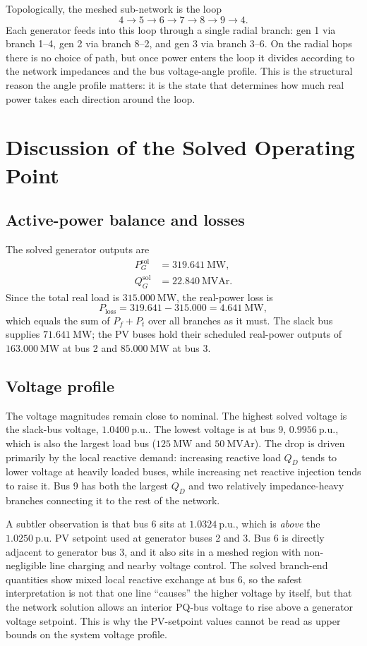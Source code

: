 \documentclass[11pt]{article}
\newcommand{\pu}{\mathrm{p.u.}}
\newcommand{\MW}{\mathrm{MW}}
\newcommand{\MVAr}{\mathrm{MVAr}}
\begin{document}
Topologically, the meshed sub-network is the loop
\[
  4 \rightarrow 5 \rightarrow 6 \rightarrow 7 \rightarrow 8
  \rightarrow 9 \rightarrow 4.
\]
Each generator feeds into this loop through a single radial branch:
gen 1 via branch 1--4, gen 2 via branch 8--2, and gen 3 via branch 3--6.
On the radial hops there is no choice of path, but once power enters the
loop it divides according to the network impedances and the bus
voltage-angle profile. This is the structural reason the angle profile
matters: it is the state that determines how much real power takes each
direction around the loop.

\section{Discussion of the Solved Operating Point}

\subsection{Active-power balance and losses}

The solved generator outputs are
\[
\begin{aligned}
  P_G^{\mathrm{sol}} &= 319.641~\MW, \\
  Q_G^{\mathrm{sol}} &= 22.840~\MVAr.
\end{aligned}
\]
Since the total real load is $315.000~\MW$, the real-power loss is
\[
  P_{\mathrm{loss}} = 319.641 - 315.000 = 4.641~\MW,
\]
which equals the sum of $P_f + P_t$ over all branches as it must. The
slack bus supplies $71.641~\MW$; the PV buses hold their scheduled
real-power outputs of $163.000~\MW$ at bus 2 and $85.000~\MW$ at bus 3.

\subsection{Voltage profile}

The voltage magnitudes remain close to nominal. The highest solved
voltage is the slack-bus voltage, $1.0400~\pu$. The lowest voltage is at
bus 9, $0.9956~\pu$, which is also the largest load bus
($125~\MW$ and $50~\MVAr$). The drop is driven primarily by the local
reactive demand: increasing reactive load $Q_D$ tends to lower voltage
at heavily loaded buses, while increasing net reactive injection tends
to raise it. Bus 9 has both the largest $Q_D$ and two relatively
impedance-heavy branches connecting it to the rest of the network.

A subtler observation is that bus 6 sits at $1.0324~\pu$, which is
\emph{above} the $1.0250~\pu$ PV setpoint used at generator buses 2 and
3. Bus 6 is directly adjacent to generator bus 3, and it also sits in a
meshed region with non-negligible line charging and nearby voltage
control. The solved branch-end quantities show mixed local reactive
exchange at bus 6, so the safest interpretation is not that one line
``causes'' the higher voltage by itself, but that the network solution
allows an interior PQ-bus voltage to rise above a generator voltage
setpoint. This is why the PV-setpoint values cannot be read as upper
bounds on the system voltage profile.
\end{document}
